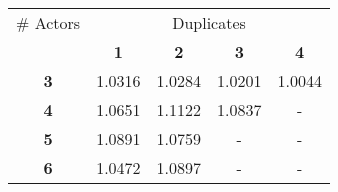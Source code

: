\begin{tabular}{ | c | c | c | c | c | }
\hline
\# Actors & \multicolumn{4}{|c|}{Duplicates} \\ \cline{2-5}
 & {\bf1} & {\bf2} & {\bf3} & {\bf4} \\ \hline \hline
{\bf 3} & 1.0316 & 1.0284 & 1.0201 & 1.0044 \\ \hline
{\bf 4} & 1.0651 & 1.1122 & 1.0837 & - \\ \hline
{\bf 5} & 1.0891 & 1.0759 & - & - \\ \hline
{\bf 6} & 1.0472 & 1.0897 & - & - \\ \hline
\end{tabular}
